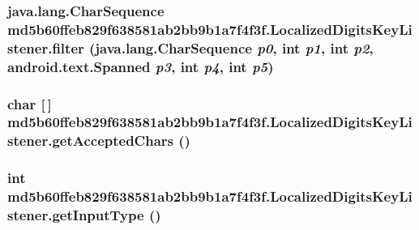 \hypertarget{classmd5b60ffeb829f638581ab2bb9b1a7f4f3f_1_1_localized_digits_key_listener_27713736596f0402b77820159014e506}{
\subsubsection[{filter}]{\setlength{\rightskip}{0pt plus 5cm}java.lang.CharSequence md5b60ffeb829f638581ab2bb9b1a7f4f3f.LocalizedDigitsKeyListener.filter (java.lang.CharSequence {\em p0}, \/  int {\em p1}, \/  int {\em p2}, \/  android.text.Spanned {\em p3}, \/  int {\em p4}, \/  int {\em p5})}}
\label{classmd5b60ffeb829f638581ab2bb9b1a7f4f3f_1_1_localized_digits_key_listener_27713736596f0402b77820159014e506}


\hypertarget{classmd5b60ffeb829f638581ab2bb9b1a7f4f3f_1_1_localized_digits_key_listener_7b55b3fb569ac307d24bb5e4bbe1edb4}{
\subsubsection[{getAcceptedChars}]{\setlength{\rightskip}{0pt plus 5cm}char \mbox{[}$\,$\mbox{]} md5b60ffeb829f638581ab2bb9b1a7f4f3f.LocalizedDigitsKeyListener.getAcceptedChars ()}}
\label{classmd5b60ffeb829f638581ab2bb9b1a7f4f3f_1_1_localized_digits_key_listener_7b55b3fb569ac307d24bb5e4bbe1edb4}


\hypertarget{classmd5b60ffeb829f638581ab2bb9b1a7f4f3f_1_1_localized_digits_key_listener_d2ee9df5ab9a58dc5587f8e51bc2ae86}{
\subsubsection[{getInputType}]{\setlength{\rightskip}{0pt plus 5cm}int md5b60ffeb829f638581ab2bb9b1a7f4f3f.LocalizedDigitsKeyListener.getInputType ()}}
\label{classmd5b60ffeb829f638581ab2bb9b1a7f4f3f_1_1_localized_digits_key_listener_d2ee9df5ab9a58dc5587f8e51bc2ae86}


